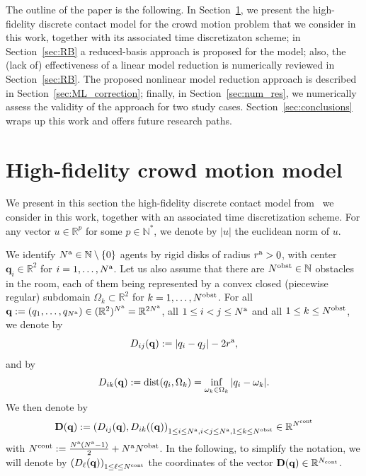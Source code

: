 The outline of the paper is the following. In Section~\ref{sec:HF}, we present the high-fidelity discrete contact model for the crowd motion problem that we consider in this work, together with its associated time discretizaton scheme; in Section~\ref{sec:RB} a reduced-basis approach is proposed for the model; also, the (lack of) effectiveness of a linear model reduction is numerically reviewed in Section~\ref{sec:RB}. The proposed nonlinear model reduction approach is described in Section~\ref{sec:ML_correction};
finally, in Section~\ref{sec:num_res}, we numerically assess the validity of the approach for two study cases. Section~\ref{sec:conclusions} wraps up this work and offers future research paths.

\section{High-fidelity crowd motion model}\label{sec:HF}

We present in this section the high-fidelity discrete contact model from~\cite{maury2011discrete} we consider in this work, together with an associated time discretization scheme. For any vector $u\in \mathbb{R}^p$ for some $p\in \mathbb{N}^*$, we denote by $|u|$ the euclidean norm of $u$. 
\medskip

We identify $N^{\rm a} \in \mathbb{N}\setminus\{0\}$ agents by rigid disks of radius $r^{\rm a}>0$, with center $\mathbf{q}_i \in \mathbb{R}^2$ for $i=1, \ldots, N^{\rm a}$. Let us also assume that there are $N^{\rm obst}\in \mathbb{N}$ obstacles in the room, each of them being represented by a convex closed (piecewise regular) subdomain $\Omega_k \subset \mathbb{R}^2$ for $k=1, \ldots, N^{\rm obst}$. For all  $\mathbf{q}  := (q_1, \ldots, q_{N^{\rm a}}) \in (\mathbb{R}^2)^{N^{\rm a}} = \mathbb{R}^{2 N^{\rm a}}$, all $1 \leq i <j \leq N^{\rm a}$ and all $1\leq k \leq N^{\rm obst}$, we denote by 
$$
D_{ij}(\mathbf{q}):=|q_i-q_j|-2r^{\rm a},
$$ 
and by 
$$
D_{ik}(\mathbf{q}) := {\rm dist}(q_i, \Omega_k) = \mathop{\inf}_{\omega_k \in \Omega_k}|q_i - \omega_k|.
$$
We then denote by 
$$
\mathbf{D}(\mathbf{q}):= \left( D_{ij}(\mathbf{q}), D_{ik}((\mathbf{q})\right)_{
1\leq i \leq N^{\rm a},
i <j \leq N^{\rm a},
1\leq k \leq N^{\rm obst}
} \in \mathbb{R}^{N^{\rm cont}}
$$
with $N^{\rm cont}:= \frac{N^{\rm a}(N^{\rm a}-1)}{2} + N^{\rm a}N^{\rm obst}$. In the following, to simplify the notation, we will denote by $\left( D_\ell(\mathbf{q})\right)_{1\leq \ell \leq N^{\rm cont}}$ the coordinates of the vector $\mathbf{D}(\mathbf{q})\in \mathbb{R}^{N_{\rm cont}}$.



